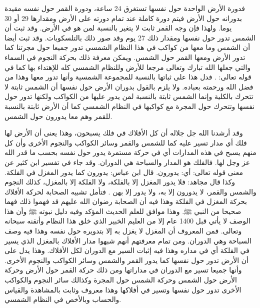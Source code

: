 فدورة الأرض الواحدة حول نفسها تستغرق 24 ساعة، ودورة القمر حول نفسه مقيدة بدورانه حول الأرض فيتم دورة كاملة عند تمام دورته على الأرض ومقدارها 29 أو 30 يوما. ولهذا فإن وجه القمر ثابت لا يتغير بالنسبة لمن هو في الأرض. وقد ثبت أن الشمس تدور حول نفسها ومقدار ذلك 27 يوم وقد صور ذلك بالتلسكوبات. وقد ثبت أيضا أن الشمس وما معها من كواكب في هذا النظام الشمسي تدور جميعا حول مجرتنا كما تدور الأرض ومعها القمر حول الشمس. ويمكن معرفة ذلك بحركة النجوم في السماء والتي جعلها الله تبارك وتعالى مرجعا للأرض وللنظام الشمسي كله للإهتداء بها كما في قوله تعالى: \quranayah*[6][97]{\footnotesize (\surahname*[6])}. فدل هذا على ثباتها بالنسبة للمجموعة الشمسية وأنها تدور معها وهذا من فضل الله ورحمته بعباده. ولا يلزم بالقول بدوران الأرض حول نفسها أن الشمس ثابتة لا تتحرك بالكلية وإنما الشمس ثابتة بالنسبة لمن يدور عليها من الكواكب ولكنها تدور حول نفسها وتتحرك حول المجرة مع كواكبها في النظام الشمسي كما أن الأرض ثابتة بالنسبة للقمر وهم معا يدورون حول الشمس.

وقد أرشدنا الله جل جلاله أن كل الأفلاك في فلك يسبحون، وهذا يعنى أن الأرض لها فلك أي مدار تسير عليه كما للشمس والقمر وسائر الكواكب والنجوم الأخرى وأن كل منهم يسبح في هذه المدارات أي في حركة مستمرة يدور حول نفسه بحسب ما قدر الله عز وجل لها. فالفلك هو المدار والسباحة هي الدوران. وقد جاء في تفسير ابن كثير عن معنى قوله تعالى: \quranayah*[36][40][12] {\footnotesize (\surahname*[36])} أي: يدورون. قال ابن عباس: يدورون كما يدور المغزل في الفلكة. وكذا قال مجاهد: فلا يدور المغزل إلا بالفلكة، ولا الفلكة إلا بالمغزل، كذلك النجوم والشمس والقمر، لا يدورون إلا به، ولا يدور إلا بهن \href{https://shamela.ws/book/8473/2750#p4}{\faExternalLink} \cite{tafsir_ibnKathir}. فتأمل تشبيه الصحابة لحركة الأفلاك بحركة المغزل في الفلكة وهذا فيه أن الصحابة رضوان الله عليهم قد فهموا ذلك فهما صحيحا من النبي ﷺ. وهذا موافق للعلم الحديث المؤكد وفيه دليل نبوته ﷺ وأن هذا الوصف لا يأتي قبل 1400 عام إلا من العليم الخبير الذي خلق هذا النظام وأتقنه سبحانه وتعالى. فمن المعروف أن المغزل لا يغزل به إلا بتدويره حول نفسه وهذا فيه وصف السباحة وهي الدوران. ومن تمام معرفتهم أنهم شبهوا مدار الأفلاك بالمغزل الذي يسير في الفلكة أي في مداره وهذا فيه إثبات السير مع الدوران لكل الأفلاك. وهذا يدل على أن الأرض تدور حول نفسها كما يدور القمر والشمس وسائر الكواكب والنجوم الأخرى. وأنها جميعا تسير مع الدوران في مداراتها ومن ذلك حركة القمر حول الأرض وحركة الأرض حول الشمس وحركة الشمس حول المجرة وكذالك سائر النجوم والكواكب الأخرى تدور حول نفسها وتسير في أفلاكها وهذا معروف وثابت بالمشاهدة والقياس والحساب وبالأخص في النظام الشمسي. 

